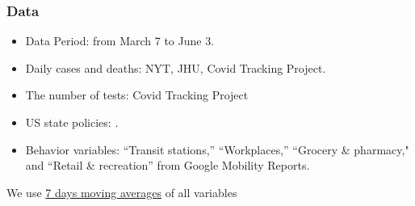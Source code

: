 \documentclass{beamer}
\def\bcolor{\color{forestgreen(web)}}
\def\pcolor{\color{blue}}
\def\wcolor{\color{gray}}
\def\ycolor{\color{red}}
\begin{document}
\begin{frame}
  \frametitle{Data}\vspace{-0.05cm} 
  
  \begin{itemize}
  \item Data Period: from March 7 to June 3.\medskip
  \item {\ycolor Daily cases and deaths}: NYT, JHU, Covid Tracking Project.\medskip
  \item {\wcolor The number of tests}: Covid Tracking Project\medskip
  \item  {\pcolor US state policies}:
\cite{raifman2020}.\medskip
\item {\bcolor Behavior variables}:  ``Transit stations,''  ``Workplaces,''  ``Grocery \& pharmacy," and ``Retail \& recreation'' from Google Mobility Reports.  
  \end{itemize} 
  
We use  \underline{7 days moving averages} of all variables %
%   

\end{frame}
 

\end{document}
